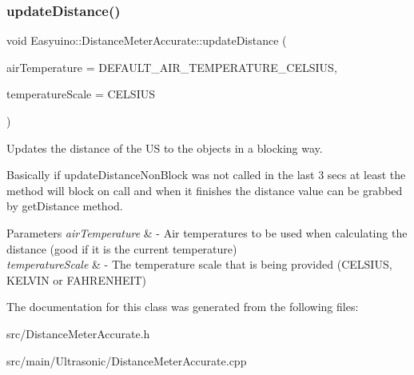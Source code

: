 \subsubsection{\texorpdfstring{update\+Distance()}{updateDistance()}}
{\footnotesize\ttfamily void Easyuino\+::\+Distance\+Meter\+Accurate\+::update\+Distance (\begin{DoxyParamCaption}\item[{IN float}]{air\+Temperature = {\ttfamily DEFAULT\+\_\+AIR\+\_\+TEMPERATURE\+\_\+CELSIUS},  }\item[{IN Temperature\+Scale}]{temperature\+Scale = {\ttfamily CELSIUS} }\end{DoxyParamCaption})}



Updates the distance of the US to the objects in a blocking way. 

Basically if update\+Distance\+Non\+Block was not called in the last 3 secs at least the method will block on call and when it finishes the distance value can be grabbed by get\+Distance method. 
\begin{DoxyParams}{Parameters}
{\em air\+Temperature} & -\/ Air temperatures to be used when calculating the distance (good if it is the current temperature) \\
\hline
{\em temperature\+Scale} & -\/ The temperature scale that is being provided (C\+E\+L\+S\+I\+US, K\+E\+L\+V\+IN or F\+A\+H\+R\+E\+N\+H\+E\+IT) \\
\hline
\end{DoxyParams}


The documentation for this class was generated from the following files\+:\begin{DoxyCompactItemize}
\item 
src/Distance\+Meter\+Accurate.\+h\item 
src/main/\+Ultrasonic/Distance\+Meter\+Accurate.\+cpp\end{DoxyCompactItemize}
